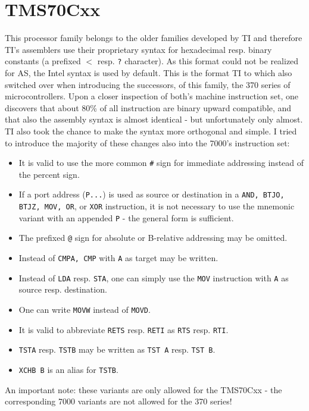 \documentclass[12pt,twoside]{report}
\newcommand{\tty}[1]{{\tt #1}}
\begin{document}

\section{TMS70Cxx}

This processor family belongs to the older families developed by TI
and therefore TI's assemblers use their proprietary syntax for
hexadecimal resp. binary constants (a prefixed $<$ resp. \tty{?} character).
As this format could not be realized for AS, the Intel syntax is used
by default.  This is the format TI to which also switched over when
introducing the successors, of this family, the 370 series of
microcontrollers.  Upon a closer inspection of both's machine
instruction set, one discovers that about 80\% of all instruction are
binary upward compatible, and that also the assembly syntax is almost
identical - but unfortunately only almost.  TI also took the chance to
make the syntax more orthogonal and simple.  I tried to introduce
the majority of these changes also into the 7000's instruction set:
\begin{itemize}
\item{It is valid to use the more common \tty{\#} sign for immediate addressing
      instead of the percent sign.}
\item{If a port address (\tty{P...}) is used as source or destination in a
      \tty{AND, BTJO, BTJZ, MOV, OR}, or \tty{XOR} instruction, it is not necessary
      to use the mnemonic variant with an appended \tty{P} - the general
      form is sufficient.}
\item{The prefixed \tty{@} sign for absolute or B-relative addressing may be
      omitted.}
\item{Instead of \tty{CMPA, CMP} with \tty{A} as target may be written.}
\item{Instead of \tty{LDA} resp. \tty{STA}, one can simply use the
      \tty{MOV} instruction with \tty{A} as source resp. destination.}
\item{One can write \tty{MOVW} instead of \tty{MOVD}.}
\item{It is valid to abbreviate \tty{RETS} resp. \tty{RETI} as \tty{RTS}
      resp. \tty{RTI}.}
\item{\tty{TSTA} resp. \tty{TSTB} may be written as \tty{TST A} resp.
      \tty{TST B}.}
\item{\tty{XCHB B} is an alias for \tty{TSTB}.}
\end{itemize}
An important note: these variants are only allowed for the TMS70Cxx -
the corresponding 7000 variants are not allowed for the 370 series!
\end{document}
